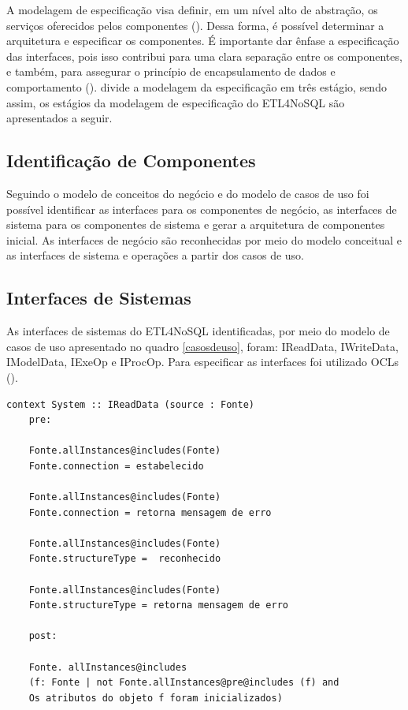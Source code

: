 A modelagem de especificação visa definir, em um nível alto de abstração, os serviços oferecidos pelos componentes (\cite{itana:2005}). Dessa forma, é possível determinar a arquitetura e especificar os componentes. É importante dar ênfase a especificação das interfaces, pois isso contribui para uma clara separação entre os componentes, e também, para assegurar o princípio de encapsulamento de dados e comportamento (\cite{itana:2005}). \cite{cheesman:2001} divide a modelagem da especificação em três estágio, sendo assim, os estágios da modelagem de especificação do ETL4NoSQL são apresentados a seguir.


\subsection{Identificação de Componentes}
Seguindo o modelo de conceitos do negócio e do modelo de casos de uso foi possível identificar as interfaces para os componentes de negócio, as interfaces de sistema para os componentes de sistema e gerar a arquitetura de componentes inicial. As interfaces de negócio são reconhecidas por meio do modelo conceitual e as interfaces de sistema e operações a partir dos casos de uso.

\subsection{Interfaces de Sistemas}

As interfaces de sistemas do ETL4NoSQL identificadas, por meio do modelo de casos de uso apresentado no quadro \ref{casosdeuso}, foram: IReadData, IWriteData, IModelData, IExeOp e IProcOp. Para especificar as interfaces foi utilizado \acp{OCL} (\cite{warmer:1998}).
\\
%
\begin{lstlisting}[frame=single, language=Oberon-2]
	context System :: IReadData (source : Fonte)	
	pre:	
	
	Fonte.allInstances@includes(Fonte) 
	Fonte.connection = estabelecido
		
	Fonte.allInstances@includes(Fonte) 
	Fonte.connection = retorna mensagem de erro
	
	Fonte.allInstances@includes(Fonte) 
	Fonte.structureType =  reconhecido	

	Fonte.allInstances@includes(Fonte)
	Fonte.structureType = retorna mensagem de erro	
	
	post:
	
	Fonte. allInstances@includes 
	(f: Fonte | not Fonte.allInstances@pre@includes (f) and	
	Os atributos do objeto f foram inicializados)	
\end{lstlisting}

